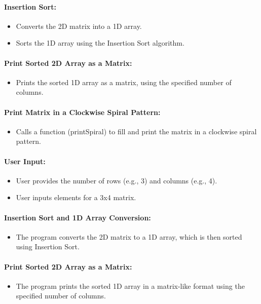 \documentclass[12pt]{article}
\begin{document}
\paragraph{Insertion Sort:}
\begin{itemize}
  \item Converts the 2D matrix into a 1D array.
  \item Sorts the 1D array using the Insertion Sort algorithm.
\end{itemize}

\paragraph{Print Sorted 2D Array as a Matrix:}
\begin{itemize}
    \item Prints the sorted 1D array as a matrix, using the specified number of columns.
\end{itemize}

\paragraph{Print Matrix in a Clockwise Spiral Pattern:}
\begin{itemize}
    \item Calls a function (printSpiral) to fill and print the matrix in a clockwise spiral pattern.
\end{itemize}

\paragraph{User Input:}
\begin{itemize}
    \item User provides the number of rows (e.g., 3) and columns (e.g., 4).
    \item User inputs elements for a 3x4 matrix.
\end{itemize}

\paragraph{Insertion Sort and 1D Array Conversion:}
\begin{itemize}
    \item The program converts the 2D matrix to a 1D array, which is then sorted using Insertion Sort.
\end{itemize}

\paragraph{Print Sorted 2D Array as a Matrix:}
\begin{itemize}
    \item The program prints the sorted 1D array in a matrix-like format using the specified number of columns.
\end{itemize}
\end{document}
